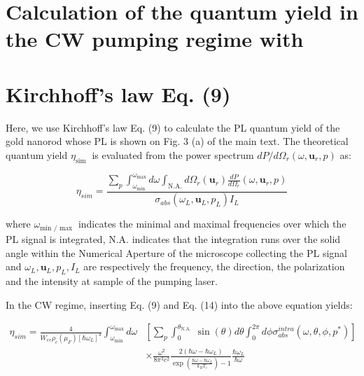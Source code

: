\documentclass[10pt]{article}
\begin{document}
\section*{Calculation of the quantum yield in the CW pumping regime with}
\section*{Kirchhoff's law Eq. (9)}
Here, we use Kirchhoff's law Eq. (9) to calculate the PL quantum yield of the gold nanorod whose PL is shown on Fig. 3 (a) of the main text. The theoretical quantum yield $\eta_{\text {sim }}$ is evaluated from the power spectrum $d P / d \Omega_{r}\left(\omega, \boldsymbol{u}_{r}, p\right)$ as:


\begin{equation*}
\eta_{s i m}=\frac{\sum_{p} \int_{\omega_{\min }}^{\omega_{\max }} d \omega \int_{\mathrm{N} . \mathrm{A} .} d \Omega_{r}\left(\boldsymbol{u}_{r}\right) \frac{d P}{d \Omega_{r}}\left(\omega, \boldsymbol{u}_{r}, p\right)}{\sigma_{a b s}\left(\omega_{L}, \boldsymbol{u}_{L}, p_{L}\right) I_{L}} \tag{15}
\end{equation*}


where $\omega_{\text {min } / \text { max }}$ indicates the minimal and maximal frequencies over which the PL signal is integrated, N.A. indicates that the integration runs over the solid angle within the Numerical Aperture of the microscope collecting the PL signal and $\omega_{L}, \boldsymbol{u}_{L}, p_{L}, I_{L}$ are respectively the frequency, the direction, the polarization and the intensity at sample of the pumping laser.

In the CW regime, inserting Eq. (9) and Eq. (14) into the above equation yields:


\begin{align*}
\eta_{s i m}=\frac{4}{W_{e e} \rho_{c}\left(\mu_{F}\right)\left[\hbar \omega_{L}\right]^{4}} \int_{\omega_{\min }}^{\omega_{\max }} d \omega & {\left[\sum_{p} \int_{0}^{\theta_{\text {N.A. }}} \sin (\theta) d \theta \int_{0}^{2 \pi} d \phi \sigma_{a b s}^{i n t r a}\left(\omega, \theta, \phi, p^{*}\right)\right] }  \tag{16}\\
& \times \frac{\omega^{2}}{8 \pi^{3} c^{2}} \frac{2\left(\hbar \omega-\hbar \omega_{L}\right)}{\exp \left(\frac{\hbar \omega-\hbar \omega_{L}}{k_{B} T_{e}}\right)-1} \frac{\hbar \omega_{L}}{\hbar \omega}
\end{align*}
\end{document}
